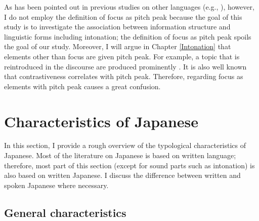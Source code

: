 As has been pointed out in previous studies on other languages (e.g., ),
however,
I do not employ the definition of focus as pitch peak
because the goal of this study is to investigate the association between information structure and linguistic forms including intonation;
the definition of focus as pitch peak spoils the goal of our study.
Moreover,
I will argue in Chapter \ref{Intonation} that 
elements other than focus are given pitch peak.
For example, a topic that is reintroduced in the discourse are produced prominently \cite[see also][]{gundel99}.
It is also well known that
contrastiveness correlates with pitch peak.
Therefore, regarding focus as elements with pitch peak causes a great confusion.






\section{Characteristics of Japanese}\label{BackSecCharJap}

In this section, I provide a rough overview of the typological characteristics of Japanese.
Most of the literature on Japanese is based on written language;
therefore, most part of this section (except for sound parts such as intonation) is also based on written Japanese.
I discuss the difference between written and spoken Japanese
where necessary.


\subsection{General characteristics}\label{BackSubSecGeneralChar}

